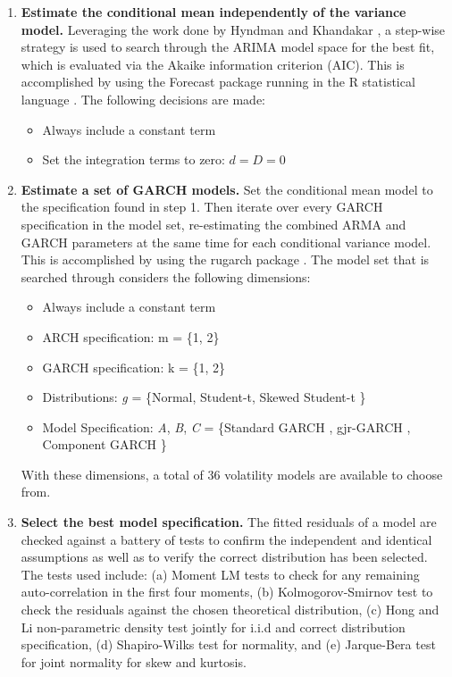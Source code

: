 \documentclass[12pt]{article}
\begin{document}
\begin{enumerate}
    \item \textbf{Estimate the conditional mean independently of the variance model.} Leveraging the work done by Hyndman and Khandakar \cite{HyndmanKhandakar2008AutoArima}, a step-wise strategy is used to search through the ARIMA model space for the best fit, which is evaluated via the Akaike information criterion (AIC). This is accomplished by using the Forecast package \cite{RForecast} running in the R statistical language \cite{RBase}. The following decisions are made: 
    
    \begin{itemize}
        \item Always include a constant term
        \item Set the integration terms to zero: $d = D = 0$
    \end{itemize}
    
    \item \textbf{Estimate a set of GARCH models.} Set the conditional mean model to the specification found in step 1. Then iterate over every GARCH specification in the model set, re-estimating the combined ARMA and GARCH parameters at the same time for each conditional variance model. This is accomplished by using the rugarch package \cite{Rugarch}. The model set that is searched through considers the following dimensions:
    
    \begin{itemize}
        \item Always include a constant term
        \item ARCH specification: m = \{1, 2\}
        \item GARCH specification: k = \{1, 2\}
        \item Distributions: \emph{g} = \{Normal, Student-t, Skewed Student-t \cite{FernandezSteel1998}\}
        \item Model Specification: \emph{A}, \emph{B}, \emph{C} = \{Standard GARCH \cite{Bollerslev1986Garch}, gjr-GARCH \cite{GJR1993Garch}, Component GARCH \cite{EngleLee1993APA} \}
    \end{itemize}
    
    With these dimensions, a total of 36 volatility models are available to choose from.

    \item \textbf{Select the best model specification.} The fitted residuals of a model are checked against a battery of tests to confirm the independent and identical assumptions as well as to verify the correct distribution has been selected. The tests used include: (a) Moment LM tests to check for any remaining auto-correlation in the first four moments, (b) Kolmogorov-Smirnov test to check the residuals against the chosen theoretical distribution, (c) Hong and Li \cite{HongLi2005} non-parametric density test jointly for i.i.d and correct distribution specification, (d) Shapiro-Wilks \cite{ShapiroWilks1965} test for normality, and (e) Jarque-Bera \cite{JarqueBera1980} test for joint normality for skew and kurtosis.
    

\end{enumerate}
\end{document}
